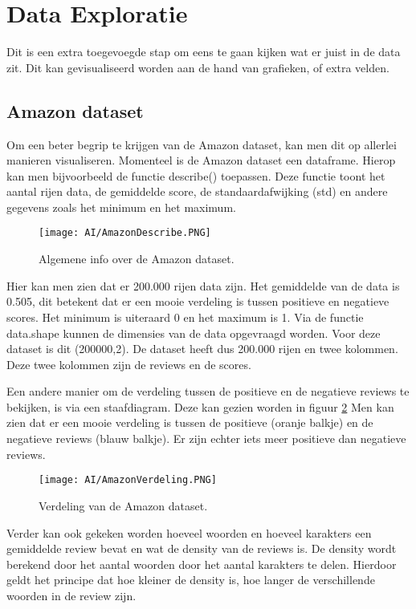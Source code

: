 \section{Data Exploratie}
\label{proofofconceptdataexploratie}
Dit is een extra toegevoegde stap om eens te gaan kijken wat er juist in de data zit. Dit kan gevisualiseerd worden aan de hand van grafieken, of extra velden. 

\subsection{Amazon dataset}
Om een beter begrip te krijgen van de Amazon dataset, kan men dit op allerlei manieren visualiseren. Momenteel is de Amazon dataset een dataframe. Hierop kan men bijvoorbeeld de functie describe() toepassen. Deze functie toont het aantal rijen data, de gemiddelde score, de \gls{standaardafwijking} (std) en andere gegevens zoals het minimum en het maximum. 

\begin{figure}[!htbp]
    \texttt{[image: AI/AmazonDescribe.PNG]}
    \caption{\label{amazondescribe}Algemene info over de Amazon dataset.}
\end{figure}
\FloatBarrier 

Hier kan men zien dat er 200.000 rijen data zijn. Het gemiddelde van de data is 0.505, dit betekent dat er een mooie verdeling is tussen positieve en negatieve scores. Het minimum is uiteraard 0 en het maximum is 1. Via de functie data.shape kunnen de dimensies van de data opgevraagd worden. Voor deze dataset is dit (200000,2). De dataset heeft dus 200.000 rijen en twee kolommen. Deze twee kolommen zijn de reviews en de scores. 

Een andere manier om de verdeling tussen de positieve en de negatieve reviews te bekijken, is via een staafdiagram. Deze kan gezien worden in figuur \ref{amazonverdeling} Men kan zien dat er een mooie verdeling is tussen de positieve (oranje balkje) en de negatieve reviews (blauw balkje). Er zijn echter iets meer positieve dan negatieve reviews.

\begin{figure}[!htbp]
    \texttt{[image: AI/AmazonVerdeling.PNG]}
    \caption{\label{amazonverdeling}Verdeling van de Amazon dataset.}
\end{figure}
\FloatBarrier 

Verder kan ook gekeken worden hoeveel woorden en hoeveel karakters een gemiddelde review bevat en wat de \gls{density} van de reviews is. De density wordt berekend door het aantal woorden door het aantal karakters te delen. Hierdoor geldt het principe dat hoe kleiner de density is, hoe langer de verschillende woorden in de review zijn. 

